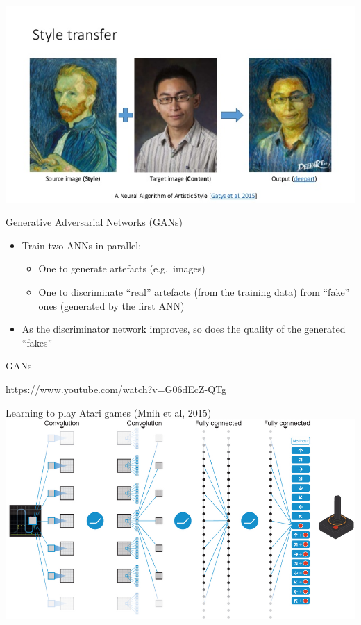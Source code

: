 \begin{frame}
	\includegraphics[width=\textwidth]{style_transfer}
\end{frame}

\begin{frame}{Generative Adversarial Networks (GANs)}
    \begin{itemize}
        \pause\item Train two ANNs in parallel:
            \begin{itemize}
                \pause\item One to generate artefacts (e.g.\ images)
                \pause\item One to discriminate ``real'' artefacts (from the training data) from ``fake'' ones
                    (generated by the first ANN)
            \end{itemize}
        \pause\item As the discriminator network improves, so does the quality of the generated ``fakes''
    \end{itemize}
\end{frame}

\begin{frame}{GANs}
    \begin{center}
        \url{https://www.youtube.com/watch?v=G06dEcZ-QTg}
    \end{center}
\end{frame}

\begin{frame}{Learning to play Atari games (Mnih et al, 2015)}
	\includegraphics[width=\textwidth]{deepmind_atari}
\end{frame}

